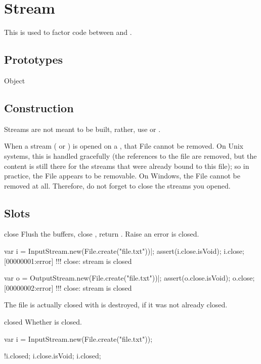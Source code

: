 
\section{Stream}

This is used to factor code between  and
.

\subsection{Prototypes}
\begin{refObjects}
\item[Object]
\end{refObjects}

\subsection{Construction}
\label{sec:specs:Stream:ctor}

Streams are not meant to be built, rather, use  or
.

When a stream ( or ) is
opened on a , that File cannot be removed.  On Unix systems,
this is handled gracefully (the references to the file are removed, but the
content is still there for the streams that were already bound to this
file); so in practice, the File appears to be removable.  On Windows, the
File cannot be removed at all.  Therefore, do not forget to close the
streams you opened.

\subsection{Slots}

\begin{urbiscriptapi}
\item[close] Flush the buffers, close \this, return .  Raise
  an error \this is closed.
\begin{urbiscript}
var i = InputStream.new(File.create("file.txt"))|;
assert(i.close.isVoid);
i.close;
[00000001:error] !!! close: stream is closed

var o = OutputStream.new(File.create("file.txt"))|;
assert(o.close.isVoid);
o.close;
[00000002:error] !!! close: stream is closed
\end{urbiscript}

  The file is actually closed with \this is destroyed, if it was not already
  closed.


\item[closed] Whether \this is closed.
\begin{urbiassert}
var i = InputStream.new(File.create("file.txt"));

!i.closed;
i.close.isVoid;
i.closed;
\end{urbiassert}
\end{urbiscriptapi}

